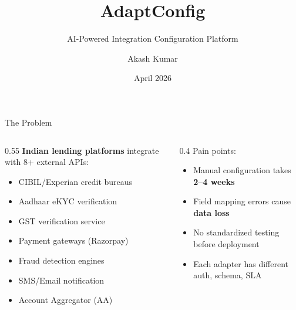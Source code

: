 \documentclass[aspectratio=169,11pt]{beamer}
\title{AdaptConfig}
\subtitle{AI-Powered Integration Configuration Platform}
\author{Akash Kumar}
\institute{IIT Patna}
\date{April 2026}
\begin{document}
\begin{frame}[plain]
\maketitle
\end{frame}

\begin{frame}{The Problem}
\begin{columns}
\begin{column}{0.55\textwidth}
\textbf{Indian lending platforms} integrate with 8+ external APIs:
\begin{itemize}
    \item CIBIL/Experian credit bureaus
    \item Aadhaar eKYC verification
    \item GST verification service
    \item Payment gateways (Razorpay)
    \item Fraud detection engines
    \item SMS/Email notification
    \item Account Aggregator (AA)
\end{itemize}
\end{column}
\begin{column}{0.4\textwidth}
\alert{Pain points:}
\begin{itemize}
    \item Manual configuration takes \textbf{2--4 weeks}
    \item Field mapping errors cause \textbf{data loss}
    \item No standardized testing before deployment
    \item Each adapter has different auth, schema, SLA
\end{itemize}
\end{column}
\end{columns}
\end{frame}
\end{document}

